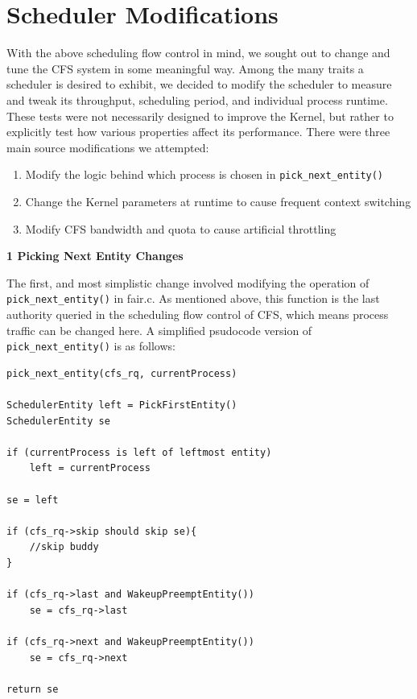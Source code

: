 \section{Scheduler Modifications}

With the above scheduling flow control in mind, we sought out to change and tune the CFS system in some meaningful way. Among the many traits a scheduler is desired to exhibit, we decided to modify the scheduler to measure and tweak its throughput, scheduling period, and individual process runtime. These tests were not necessarily designed to improve the Kernel, but rather to explicitly test how various properties affect its performance. There were three main source modifications we attempted:
\begin{enumerate}
	\item Modify the logic behind which process is chosen in \texttt{pick\_next\_entity()}
	\item Change the Kernel parameters at runtime to cause frequent context switching
	\item Modify CFS bandwidth and quota to cause artificial throttling
\end{enumerate}

\vspace{1pc}
\noindent\textbf{1 Picking Next Entity Changes}

\vspace{1pc}

The first, and most simplistic change involved modifying the operation of \texttt{pick\_next\_entity()} in fair.c. As mentioned above, this function is the last authority queried in the scheduling flow control of CFS, which means process traffic can be changed here. A simplified psudocode version of \texttt{pick\_next\_entity()} is as follows:
\begin{lstlisting}
pick_next_entity(cfs_rq, currentProcess)

SchedulerEntity left = PickFirstEntity()
SchedulerEntity se

if (currentProcess is left of leftmost entity)
	left = currentProcess

se = left

if (cfs_rq->skip should skip se){
	//skip buddy
}

if (cfs_rq->last and WakeupPreemptEntity())
	se = cfs_rq->last
	
if (cfs_rq->next and WakeupPreemptEntity())
	se = cfs_rq->next

return se
\end{lstlisting}

